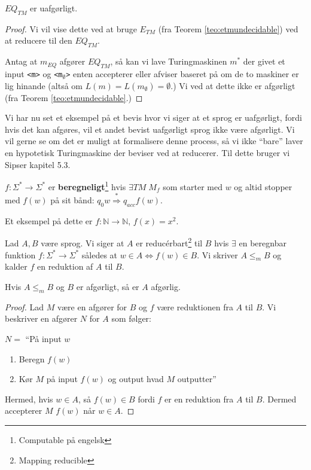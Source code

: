 \begin{theorem}
	$EQ_{TM}$ er uafgørligt.
\end{theorem}

\begin{proof}
	Vi vil vise dette ved at bruge $E_{TM}$ (fra Teorem \ref{teo:etmundecidable}) ved at reducere til den $EQ_{TM}$.

	Antag at $m_{EQ}$ afgører $EQ_{TM}$, så kan vi lave Turingmaskinen $m^{*}$ der givet et input \texttt{<m>} og \texttt{<m$_{\emptyset}$>} enten accepterer eller afviser baseret på om de to maskiner er lig hinande (altså om $L(m) = L(m_{\emptyset}) = \emptyset$.) Vi ved at dette ikke er afgørligt (fra Teorem \ref{teo:etmundecidable}.)
\end{proof}

Vi har nu set et eksempel på et bevis hvor vi siger at et sprog er uafgørligt, fordi hvis det kan afgøres, vil et andet bevist uafgørligt sprog ikke være afgørligt. Vi vil gerne se om det er muligt at formalisere denne process, så vi ikke ``bare'' laver en hypotetisk Turingmaskine der beviser ved at reducerer. Til dette bruger vi Sipser kapitel 5.3.
\begin{definition}
	$f : \Sigma^{*} \rightarrow \Sigma^{*}$ er \textbf{beregneligt}\footnote{Computable på engelsk} hvis $\exists TM \;M_{f}$ som starter med $w$ og altid stopper med $f(w)$ på sit bånd: $q_{0}w \stackrel{*}{\Rightarrow} q_{acc}f(w)$.
\end{definition}

Et eksempel på dette er $f : \mathbb{N} \rightarrow \mathbb{N}$, $f(x) = x^{2}$.

\begin{definition}
	Lad $A, B$ være sprog. Vi siger at $A$ er reducérbart\footnote{Mapping reducible} til $B$ hvis $\exists$ en beregnbar funktion $f : \Sigma^{*} \rightarrow \Sigma^{*}$ således at $w \in A \iff f(w) \in B$. Vi skriver $A \le _{m}B$ og kalder $f$ en reduktion af $A$ til $B$.
\end{definition}

\begin{theorem}
	Hvis $A \leq _{m}B$ og $B$ er afgørligt, så er $A$ afgørlig.
\end{theorem}

\begin{proof}
  Lad $M$ være en afgører for $B$ og $f$ være reduktionen fra $A$ til $B$. Vi beskriver en afgører $N$ for $A$ som følger:

  $N = $ ``På input $w$
  \begin{enumerate}
	\item Beregn $f(w)$
	\item Kør $M$ på input $f(w)$ og output hvad $M$ outputter''
  \end{enumerate}

Hermed, hvis $w \in A$, så $f(w) \in B$ fordi $f$ er en reduktion fra $A$ til $B$. Dermed accepterer $M$ $f(w)$ når $w \in A$.
\end{proof}

